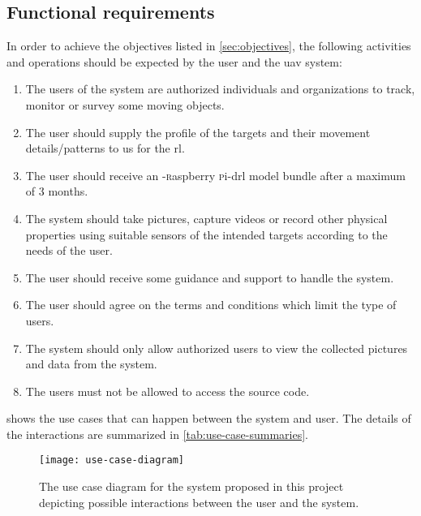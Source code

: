 \documentclass[../main.tex]{subfiles}
\begin{document}
\subsection{Functional requirements}

In order to achieve the objectives listed
in \cref{sec:objectives}, the following activities 
and operations should be expected by the user 
and the \gls{uav} system:

\begin{enumerate}
    \item The users of the system are authorized
        individuals and organizations to track, monitor or survey
        some moving objects.
    \item The user should supply the 
        profile of the targets 
        and their movement details/patterns
        to us for the \gls{rl}.
    \item The user should receive 
        an \anafi-\textsc{r}aspberry \textsc{p}i-\gls{drl} 
        model bundle after a maximum of 3 months.
    \item The system should take pictures, capture videos
        or record other physical properties using
        suitable sensors of the intended
        targets according to the needs
        of the user.
    \item The user should receive some 
        guidance and support 
        to handle the system.
    \item The user should agree on 
        the terms and conditions 
        which limit the type of users.
    \item The system should only allow 
        authorized users 
        to view the collected pictures and 
        data from the \anafi system.
    \item The users must not be allowed to access 
        the source code.
\end{enumerate}

 shows the use cases that can
happen between the system and user. The details of the
interactions are summarized in \cref{tab:use-case-summaries}.

\begin{figure}[tb] 
    \centering
    \texttt{[image: use-case-diagram]} 
    \caption{The use case diagram for the system proposed 
            in this project depicting possible interactions 
            between the user and the system.}
    \label{fig:use-case-diagram} 
\end{figure}
\end{document}

